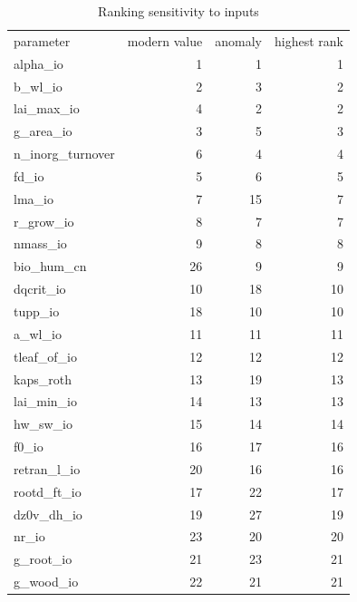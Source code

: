 \documentclass[gmd, manuscript]{copernicus}
\begin{document}
\begin{table}[t]
\caption{Ranking sensitivity to inputs}
\label{table:sens_rank}
\begin{tabular}{l r r r}
\tophline
parameter & modern value & anomaly & highest rank \\ 
\middlehline

alpha\_io    &                1    &   1     &   1 \\
b\_wl\_io       &              2   &    3    &    2 \\
lai\_max\_io      &            4     &  2    &    2 \\
g\_area\_io     &              3   &    5     &   3 \\
n\_inorg\_turnover     &      6    &   4       & 4 \\
fd\_io            &           5    &   6      &  5 \\
lma\_io            &          7    &  15    &    7 \\
r\_grow\_io         &          8   &    7    &    7 \\
nmass\_io         &           9   &    8    &    8 \\
bio\_hum\_cn        &         26   &    9    &    9 \\
dqcrit\_io        &          10    &  18    &   10 \\
tupp\_io          &          18    &  10   &    10 \\
a\_wl\_io          &          11   &   11   &    11 \\
tleaf\_of\_io      &          12    &  12    &   12 \\
kaps\_roth        &          13   &   19    &   13 \\
lai\_min\_io       &          14   &   13    &   13 \\
hw\_sw\_io          &         15   &   14    &   14 \\
f0\_io            &          16    &  17   &    16 \\
retran\_l\_io      &          20    &  16   &    16 \\
rootd\_ft\_io      &          17    &  22   &    17 \\
dz0v\_dh\_io       &          19   &   27    &   19 \\
nr\_io            &          23    &  20     &  20 \\
g\_root\_io        &          21  &    23    &   21 \\
g\_wood\_io         &         22    &  21    &   21 \\

\end{tabular}
\end{table}
\end{document}
